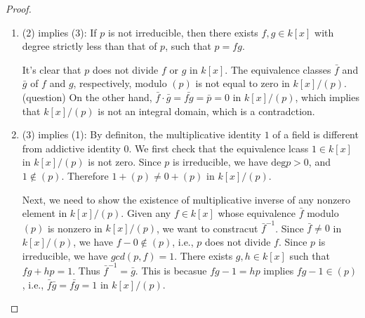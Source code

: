 \begin{proof}
\begin{enumerate}
\item
(2) implies (3): If $p$ is not irreducible, then there exists $f,g\in k[x]$ with degree strictly less than that of $p$, such that $p=fg$.

It's clear that $p$ does not divide $f$ or $g$ in $k[x]$. The equivalence classes $\bar f$ and $\bar g$ of $f$ and $g$, respectively, modulo $(p)$ is not equal to zero in $k[x]/(p)$. (question) On the other hand, $\bar f\cdot\bar g=\bar{fg}=\bar p=0$ in $k[x]/(p)$, which implies that $k[x]/(p)$ is not an integral domain, which is a contradction.
\item
(3) implies (1): By definiton, the multiplicative identity $1$ of a field is different from addictive identity $0$. We first check that the equivalence lcass $1\in k[x]$ in $k[x]/(p)$ is not zero. Since $p$ is irreducible, we have $\mbox{deg}p>0$, and $1\notin(p)$. Therefore $1+(p)\ne 0+(p)$ in $k[x]/(p)$.

Next, we need to show the existence of multiplicative inverse of any nonzero element in $k[x]/(p)$. Given any $f\in k[x]$ whose equivalence $\bar f$ modulo $(p)$ is nonzero in $k[x]/(p)$, we want to constracut $\bar{f}^{-1}$. Since $\bar{f}\ne0$ in $k[x]/(p)$, we have $f-0\notin(p)$, i.e., $p$ does not divide $f$. Since $p$ is irreducible, we have $gcd(p,f)=1$. There exists $g,h\in k[x]$ such that $fg+hp=1$. Thus $\bar{f}^{-1}=\bar{g}$. This is becasue $fg-1=hp$ implies $fg-1\in(p)$, i.e., $\bar{f}\bar{g}=\bar{fg}=1$ in $k[x]/(p)$.


\end{enumerate}
\end{proof}















